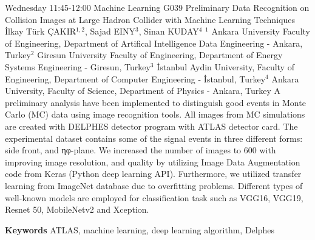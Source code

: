 
    \begin{abstract_basarim}
    {Wednesday 11:45-12:00}
    {Machine Learning}
    {G039}
    {Preliminary Data Recognition on Collision Images at Large Hadron Collider with Machine Learning Techniques}
    {%
    İlkay Türk ÇAKIR$^{1,2}$, Sajad EINY$^{3}$, Sinan KUDAY$^{4}$}
    {%
    }
    {%
    $^1$ Ankara University Faculty of Engineering, Department of Artifical Intelligence Data Engineering - Ankara, Turkey\newline{}$^2$ Giresun University Faculty of Engineering, Department of Energy Systems Engineering - Giresun, Turkey\newline{}$^3$ İstanbul Aydin University, Faculty of Engineering, Department of Computer Engineering - İstanbul, Turkey\newline{}$^4$ Ankara University, Faculty of Science, Department of Physics - Ankara, Turkey}
    A preliminary analysis have been implemented to distinguish good events in Monte Carlo (MC) data using image recognition tools. All images from MC simulations are created with DELPHES detector program with ATLAS detector card. The experimental dataset contains some of the signal events in three different forms: side front, and ηφ-plane. We increased the number of images to 600 with improving image resolution, and quality by utilizing Image Data Augmentation code from Keras (Python deep learning API). Furthermore, we utilized transfer learning from ImageNet database due to overfitting problems. Different types of well-known models are employed for classification task such as VGG16, VGG19, Resnet 50, MobileNetv2 and Xception.  
    
        \textbf{Keywords} \newline{}ATLAS, machine learning, deep learning algorithm, Delphes
    \end{abstract_basarim}
    